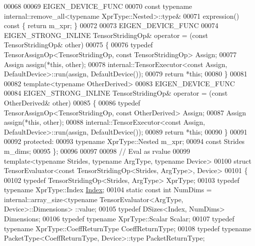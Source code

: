\begin{DoxyCode}
00068 
00069     EIGEN\_DEVICE\_FUNC
00070     \textcolor{keyword}{const} \textcolor{keyword}{typename} internal::remove\_all<typename XprType::Nested>::type&
00071     expression()\textcolor{keyword}{ const }\{ \textcolor{keywordflow}{return} m\_xpr; \}
00072 
00073     EIGEN\_DEVICE\_FUNC
00074     EIGEN\_STRONG\_INLINE TensorStridingOp& operator = (\textcolor{keyword}{const} TensorStridingOp& other)
00075     \{
00076       \textcolor{keyword}{typedef} TensorAssignOp<TensorStridingOp, const TensorStridingOp> Assign;
00077       Assign assign(*\textcolor{keyword}{this}, other);
00078       internal::TensorExecutor<const Assign, DefaultDevice>::run(assign, DefaultDevice());
00079       \textcolor{keywordflow}{return} *\textcolor{keyword}{this};
00080     \}
00081 
00082     \textcolor{keyword}{template}<\textcolor{keyword}{typename} OtherDerived>
00083     EIGEN\_DEVICE\_FUNC
00084     EIGEN\_STRONG\_INLINE TensorStridingOp& operator = (\textcolor{keyword}{const} OtherDerived& other)
00085     \{
00086       \textcolor{keyword}{typedef} TensorAssignOp<TensorStridingOp, const OtherDerived> Assign;
00087       Assign assign(*\textcolor{keyword}{this}, other);
00088       internal::TensorExecutor<const Assign, DefaultDevice>::run(assign, DefaultDevice());
00089       \textcolor{keywordflow}{return} *\textcolor{keyword}{this};
00090     \}
00091 
00092   \textcolor{keyword}{protected}:
00093     \textcolor{keyword}{typename} XprType::Nested m\_xpr;
00094     \textcolor{keyword}{const} Strides m\_dims;
00095 \};
00096 
00097 
00098 \textcolor{comment}{// Eval as rvalue}
00099 \textcolor{keyword}{template}<\textcolor{keyword}{typename} Str\textcolor{keywordtype}{id}es, \textcolor{keyword}{typename} ArgType, \textcolor{keyword}{typename} Device>
00100 \textcolor{keyword}{struct }TensorEvaluator<const TensorStridingOp<Strides, ArgType>, Device>
00101 \{
00102   \textcolor{keyword}{typedef} TensorStridingOp<Strides, ArgType> XprType;
00103   \textcolor{keyword}{typedef} \textcolor{keyword}{typename} XprType::Index \hyperlink{namespace_eigen_a62e77e0933482dafde8fe197d9a2cfde}{Index};
00104   \textcolor{keyword}{static} \textcolor{keyword}{const} \textcolor{keywordtype}{int} NumDims = internal::array\_size<typename TensorEvaluator<ArgType, Device>::Dimensions>
      ::value;
00105   \textcolor{keyword}{typedef} DSizes<Index, NumDims> Dimensions;
00106   \textcolor{keyword}{typedef} \textcolor{keyword}{typename} XprType::Scalar Scalar;
00107   \textcolor{keyword}{typedef} \textcolor{keyword}{typename} XprType::CoeffReturnType CoeffReturnType;
00108   \textcolor{keyword}{typedef} \textcolor{keyword}{typename} PacketType<CoeffReturnType, Device>::type PacketReturnType;

\end{DoxyCode}
